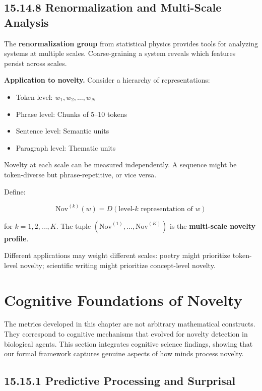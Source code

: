 \subsection{15.14.8 Renormalization and Multi-Scale Analysis}

The \textbf{renormalization group} from statistical physics provides tools for analyzing systems at multiple scales. Coarse-graining a system reveals which features persist across scales.

\textbf{Application to novelty.} Consider a hierarchy of representations:
\begin{itemize}
\item Token level: $w_1, w_2, \ldots, w_N$
\item Phrase level: Chunks of 5--10 tokens
\item Sentence level: Semantic units
\item Paragraph level: Thematic units
\end{itemize}

Novelty at each scale can be measured independently. A sequence might be token-diverse but phrase-repetitive, or vice versa.

\begin{definition}
Define:

\[\mathrm{Nov}^{(k)}(w) = D(\text{level-}k \text{ representation of } w)\]

for $k = 1, 2, \ldots, K$. The tuple $(\mathrm{Nov}^{(1)}, \ldots, \mathrm{Nov}^{(K)})$ is the \textbf{multi-scale novelty profile}.

Different applications may weight different scales: poetry might prioritize token-level novelty; scientific writing might prioritize concept-level novelty.
\end{definition}



\section{Cognitive Foundations of Novelty}

The metrics developed in this chapter are not arbitrary mathematical constructs. They correspond to cognitive mechanisms that evolved for novelty detection in biological agents. This section integrates cognitive science findings, showing that our formal framework captures genuine aspects of how minds process novelty.

\subsection{15.15.1 Predictive Processing and Surprisal}

